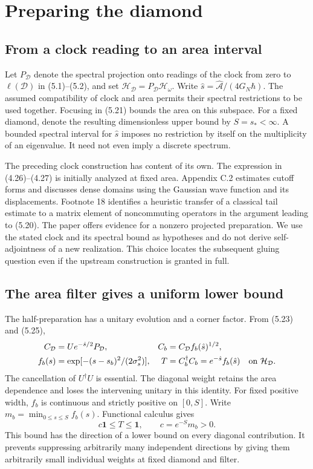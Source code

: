 \documentclass[11pt]{article}
\newcommand{\id}{\mathbf{1}}
\newcommand{\HH}{\mathcal H_{\mathcal D}}
\newcommand{\areaop}{\hat s}
\newcommand{\cD}{C_{\mathcal D}}
\newcommand{\parttitle}[2]{\clearpage\section{#1}\markboth{#2}{#2}}
\begin{document}
\parttitle{Preparing the diamond}{Preparing the diamond}
\subsection{From a clock reading to an area interval}
Let $P_{\mathcal D}$ denote the spectral projection onto readings of the clock from zero to $\ell(\mathcal D)$ in (5.1)--(5.2), and set $\HH=P_{\mathcal D}\mathcal H_\omega$. Write $\areaop=\widehat{\mathcal A}/(4G_N\hbar)$. The assumed compatibility of clock and area permits their spectral restrictions to be used together. Focusing in (5.21) bounds the area on this subspace. For a fixed diamond, denote the resulting dimensionless upper bound by $S=s_*<\infty$. A bounded spectral interval for $\areaop$ imposes no restriction by itself on the multiplicity of an eigenvalue. It need not even imply a discrete spectrum.

The preceding clock construction has content of its own. The expression in (4.26)--(4.27) is initially analyzed at fixed area. Appendix C.2 estimates cutoff forms and discusses dense domains using the Gaussian wave function and its displacements. Footnote 18 identifies a heuristic transfer of a classical tail estimate to a matrix element of noncommuting operators in the argument leading to (5.20). The paper offers evidence for a nonzero projected preparation. We use the stated clock and its spectral bound as hypotheses and do not derive self-adjointness of a new realization. This choice locates the subsequent gluing question even if the upstream construction is granted in full.

\subsection{The area filter gives a uniform lower bound}
The half-preparation has a unitary evolution and a corner factor. From (5.23) and (5.25),
\begin{align}
\cD&=U e^{-\areaop/2}P_{\mathcal D},&
C_b&=\cD f_b(\areaop)^{1/2},\\
f_b(s)&=\exp[-(s-s_b)^2/(2\sigma_s^2)],&
T&=C_b^\dagger C_b=e^{-\areaop}f_b(\areaop)\quad\hbox{on }\HH .
\end{align}
The cancellation of $U^\dagger U$ is essential. The diagonal weight retains the area dependence and loses the intervening unitary in this identity. For fixed positive width, $f_b$ is continuous and strictly positive on $[0,S]$. Write $m_b=\min_{0\le s\le S} f_b(s)$. Functional calculus gives
\begin{equation}\label{eq:floor}
c\id\le T\le\id,\qquad c=e^{-S}m_b>0 .
\end{equation}
This bound has the direction of a lower bound on every diagonal contribution. It prevents suppressing arbitrarily many independent directions by giving them arbitrarily small individual weights at fixed diamond and filter.
\end{document}
